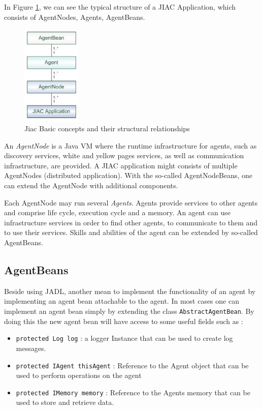 In Figure \ref{fig:jiac_basic}, we can see the typical structure of a JIAC Application, which consists of AgentNodes, Agents, AgentBeans.
\begin{figure}[h]
	\centering
		\includegraphics[width=0.25\textwidth]{images/jiac_basic.png}
		\caption{Jiac Basic concepts and their structural relationships \cite{JIACMAN10}}
	\label{fig:jiac_basic}
\end{figure}
An \textit{AgentNode} is a Java VM where the runtime infrastructure for agents, such as discovery services, white and yellow pages services, as well as communication infrastructure, are provided. A JIAC application might consists of multiple AgentNodes (distributed application). With the so-called AgentNodeBeans, one can extend the AgentNode with additional components.

Each AgentNode may run several \textit{Agents}. Agents provide services to other agents
and comprise life cycle, execution cycle and a memory. An agent can use infrastructure
services in order to find other agents, to communicate to them and to use their services.
Skills and abilities of the agent can be extended by so-called AgentBeans.


\subsection{AgentBeans}
Beside using JADL, another mean to implement the functionality of an agent by implementing an agent bean attachable to the agent.
In most cases one can implement an agent bean simply by extending the class \texttt{AbstractAgentBean}. By doing this the new agent bean will have access to some useful fields such as :
\begin{itemize}
	\item \texttt{protected Log log} : a logger Instance that can be used to create log messages.
	\item \texttt{protected IAgent thisAgent} : Reference to the Agent object that can be used to perform operations on the agent
	\item \texttt{protected IMemory memory} : Reference to the Agents memory that can be used to store and retrieve data.
\end{itemize}

